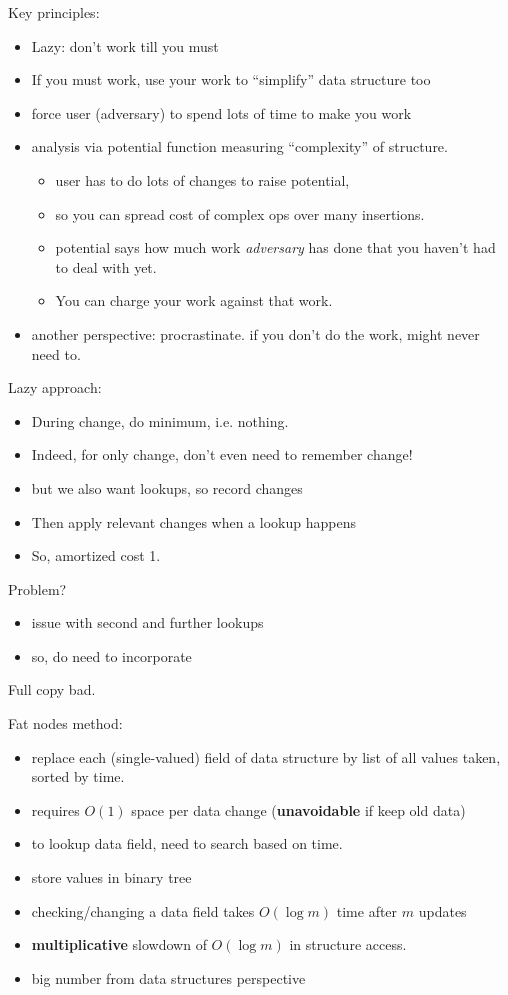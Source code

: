 \documentclass{article}
\begin{document}
Key principles:
\begin{itemize}
\item Lazy: don't work till you must
\item If you must work, use your work to ``simplify''
  data structure too
\item force user (adversary) to spend lots of time to make you work
\item analysis via potential function measuring ``complexity'' of
  structure.  
\begin{itemize}
\item user has to do lots of changes to raise potential, 
\item so you can spread cost of complex ops over many insertions.  
\item potential says how much work \emph{adversary} has done that you
  haven't had to deal with yet.  
\item You can charge your work against that work.
\end{itemize}
\item another perspective: procrastinate.  if you don't do the work,
  might never need to.
\end{itemize}

Lazy approach:
\begin{itemize}
\item During change, do minimum, i.e. nothing.
\item Indeed, for only change, don't even need to remember change!
\item but we also want lookups, so record changes
\item Then apply relevant changes when a lookup happens
\item So, amortized cost 1.
\end{itemize}

Problem?
\begin{itemize}
\item issue with second and further lookups
\item so, do need to incorporate 
\end{itemize}




Full copy bad.

Fat nodes method:
\begin{itemize}
\item replace each (single-valued) field of data structure by list of
  all values taken, sorted by time.
\item requires $O(1)$ space per data change (\textbf{unavoidable} if keep
  old data)
\item to lookup data field, need to search based on time.
\item store values in binary tree
\item checking/changing a data field takes $O(\log m)$ time after $m$
  updates
\item \textbf{multiplicative} slowdown of $O(\log m)$ in structure
  access.
\item big number from data structures perspective
\end{itemize}
\end{document}

